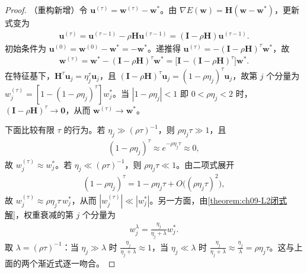 \documentclass[../../main.tex]{subfiles}
\begin{document}
\begin{proof}
（重构新增）令 $\boldsymbol{u}^{(\tau)}=\boldsymbol{w}^{(\tau)}-\boldsymbol{w}^{*}$。由 $\nabla E(\boldsymbol{w})=\boldsymbol{H}(\boldsymbol{w}-\boldsymbol{w}^{*})$，更新式变为
\begin{align*}
\boldsymbol{u}^{(\tau)}=\boldsymbol{u}^{(\tau-1)}-\rho\boldsymbol{H}\boldsymbol{u}^{(\tau-1)}=(\boldsymbol{I}-\rho\boldsymbol{H})\boldsymbol{u}^{(\tau-1)}.
\end{align*}
初始条件为 $\boldsymbol{u}^{(0)}=\boldsymbol{w}^{(0)}-\boldsymbol{w}^{*}=-\boldsymbol{w}^{*}$。递推得 $\boldsymbol{u}^{(\tau)}=-(\boldsymbol{I}-\rho\boldsymbol{H})^{\tau}\boldsymbol{w}^{*}$，故
\begin{align*}
\boldsymbol{w}^{(\tau)}=\boldsymbol{w}^{*}-(\boldsymbol{I}-\rho\boldsymbol{H})^{\tau}\boldsymbol{w}^{*}=\bigl[\boldsymbol{I}-(\boldsymbol{I}-\rho\boldsymbol{H})^{\tau}\bigr]\boldsymbol{w}^{*}.
\end{align*}
在特征基下，$\boldsymbol{H}^{\tau}\boldsymbol{u}_{j}=\eta_{j}^{\tau}\boldsymbol{u}_{j}$，且 $(\boldsymbol{I}-\rho\boldsymbol{H})^{\tau}\boldsymbol{u}_{j}=(1-\rho\eta_{j})^{\tau}\boldsymbol{u}_{j}$，故第 $j$ 个分量为 $w_{j}^{(\tau)}=[1-(1-\rho\eta_{j})^{\tau}]w_{j}^{*}$。当 $|1-\rho\eta_{j}|<1$ 即 $0<\rho\eta_{j}<2$ 时，$(\boldsymbol{I}-\rho\boldsymbol{H})^{\tau}\to\boldsymbol{0}$，从而 $\boldsymbol{w}^{(\tau)}\to\boldsymbol{w}^{*}$。

下面比较有限 $\tau$ 的行为。若 $\eta_{j}\gg(\rho\tau)^{-1}$，则 $\rho\eta_{j}\tau\gg1$，且
\begin{align*}
(1-\rho\eta_{j})^{\tau}\approx e^{-\rho\eta_{j}\tau}\approx0,
\end{align*}
故 $w_{j}^{(\tau)}\approx w_{j}^{*}$。若 $\eta_{j}\ll(\rho\tau)^{-1}$，则 $\rho\eta_{j}\tau\ll1$。由二项式展开
\begin{align*}
(1-\rho\eta_{j})^{\tau}=1-\rho\eta_{j}\tau+O\bigl((\rho\eta_{j}\tau)^{2}\bigr),
\end{align*}
故 $w_{j}^{(\tau)}\approx\rho\eta_{j}\tau\,w_{j}^{*}$，从而 $|w_{j}^{(\tau)}|\ll|w_{j}^{*}|$。另一方面，由\cref{theorem:ch09-L2闭式解}，权重衰减的第 $j$ 个分量为
\begin{align*}
w_{j}^{\lambda}=\frac{\eta_{j}}{\eta_{j}+\lambda}w_{j}^{*}.
\end{align*}
取 $\lambda=(\rho\tau)^{-1}$：当 $\eta_{j}\gg\lambda$ 时 $\frac{\eta_{j}}{\eta_{j}+\lambda}\approx1$，当 $\eta_{j}\ll\lambda$ 时 $\frac{\eta_{j}}{\eta_{j}+\lambda}\approx\frac{\eta_{j}}{\lambda}=\rho\eta_{j}\tau$。这与上面的两个渐近式逐一吻合。
\end{proof}
\end{document}
